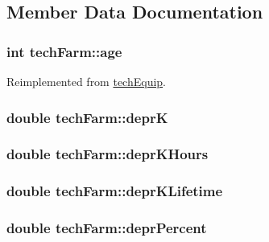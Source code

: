 \subsection{Member Data Documentation}
\hypertarget{classtech_farm_a938e00cc70834f5115fa1fde901a8ca9}{
\subsubsection[{age}]{\setlength{\rightskip}{0pt plus 5cm}int {\bf techFarm::age}}}
\label{classtech_farm_a938e00cc70834f5115fa1fde901a8ca9}


Reimplemented from \hyperlink{classtech_equip_abcca018fbc3f7fa3f12258914e1d20f7}{techEquip}.\hypertarget{classtech_farm_ab6e2b2da18fe94c6b383e7debd6e24e3}{
\subsubsection[{deprK}]{\setlength{\rightskip}{0pt plus 5cm}double {\bf techFarm::deprK}}}
\label{classtech_farm_ab6e2b2da18fe94c6b383e7debd6e24e3}
\hypertarget{classtech_farm_a8bfead4fd584c3ce436d4ca690063f19}{
\subsubsection[{deprKHours}]{\setlength{\rightskip}{0pt plus 5cm}double {\bf techFarm::deprKHours}}}
\label{classtech_farm_a8bfead4fd584c3ce436d4ca690063f19}
\hypertarget{classtech_farm_a47efbd2140c6cdfac72124975d020642}{
\subsubsection[{deprKLifetime}]{\setlength{\rightskip}{0pt plus 5cm}double {\bf techFarm::deprKLifetime}}}
\label{classtech_farm_a47efbd2140c6cdfac72124975d020642}
\hypertarget{classtech_farm_a74f6c9c28417b9aadebe157496d55313}{
\subsubsection[{deprPercent}]{\setlength{\rightskip}{0pt plus 5cm}double {\bf techFarm::deprPercent}}}
